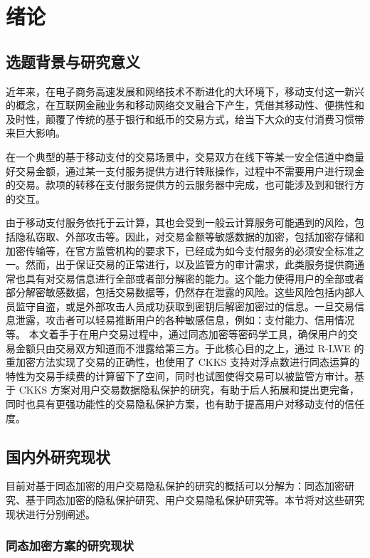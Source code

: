 \chapter{绪论}

\section{选题背景与研究意义}
近年来，在电子商务高速发展和网络技术不断进化的大环境下，移动支付这一新兴的概念，在互联网金融业务和移动网络交叉融合下产生，凭借其移动性、便携性和及时性，颠覆了传统的基于银行和纸币的交易方式，给当下大众的支付消费习惯带来巨大影响。\cite{mobilepaymentrisk}

在一个典型的基于移动支付的交易场景中，交易双方在线下等某一安全信道中商量好交易金额，通过某一支付服务提供方进行转账操作，过程中不需要用户进行现金的交易。款项的转移在支付服务提供方的云服务器中完成，也可能涉及到和银行方的交互。

由于移动支付服务依托于云计算，其也会受到一般云计算服务可能遇到的风险，包括隐私窃取、外部攻击等\cite{cloudrisk}。因此，对交易金额等敏感数据的加密，包括加密存储和加密传输等，在官方监管机构的要求下，已经成为如今支付服务的必须安全标准之一。\cite{gov_pay}然而，出于保证交易的正常进行，以及监管方的审计需求，此类服务提供商通常也具有对交易信息进行全部或者部分解密的能力。这个能力使得用户的全部或者部分解密敏感数据，包括交易数据等，仍然存在泄露的风险。这些风险包括内部人员监守自盗，或是外部攻击人员成功获取到密钥后解密加密过的信息\cite{lastpass}。一旦交易信息泄露，攻击者可以轻易推断用户的各种敏感信息，例如：支付能力、信用情况等。
本文着手于在用户交易过程中，通过同态加密等密码学工具，确保用户的交易金额只由交易双方知道而不泄露给第三方。于此核心目的之上，通过 R-LWE 的重加密方法\cite{Mouchet2020LattigoAM,lattigoRepo}实现了交易的正确性，也使用了 CKKS 支持对浮点数进行同态运算的特性为交易手续费的计算留下了空间，同时也试图使得交易可以被监管方审计。基于 CKKS 方案对用户交易数据隐私保护的研究，有助于后人拓展和提出更完备，同时也具有更强功能性的交易隐私保护方案，也有助于提高用户对移动支付的信任度。

\section{国内外研究现状}

目前对基于同态加密的用户交易隐私保护的研究的概括可以分解为：同态加密研究、基于同态加密的隐私保护研究、用户交易隐私保护研究等。本节将对这些研究现状进行分别阐述。

\subsection{同态加密方案的研究现状}

